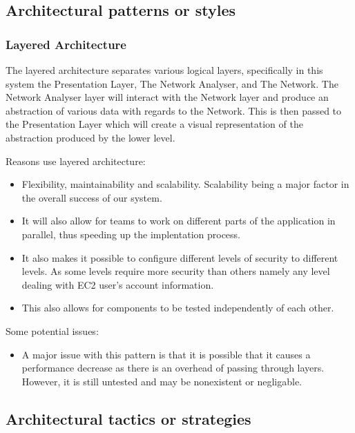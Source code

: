 \documentclass[a4paper,12pt]{report}
\begin{document}
	\subsection{Architectural patterns or styles}
		\subsubsection{Layered Architecture}
		The layered architecture separates various logical layers, specifically in this system the Presentation Layer, The Network Analyser, and The Network. The Network Analyser layer will interact with the Network layer and produce an abstraction of various data with regards to the Network. This is then passed to the Presentation Layer which will create a visual representation of the abstraction produced by the lower level.
		
		Reasons use layered architecture:
		\begin{itemize}
			\item Flexibility, maintainability and scalability. Scalability being a major factor in the overall success of our system. 
			\item It will also allow for teams to work on different parts of the application in parallel, thus speeding up the implentation process. 
			\item It also makes it possible to configure different levels of security to different levels. As some levels require more security than others namely any level dealing with EC2 user's account information.
			\item This also allows for components to be tested independently of each other. 
		\end{itemize}
		
		Some potential issues:
		\begin{itemize}
			\item A major issue with this pattern is that it is possible that it causes a performance decrease as there is an overhead of passing through layers. However, it is still untested and may be nonexistent or negligable.
		\end{itemize}
	\subsection{Architectural tactics or strategies}
\end{document}
